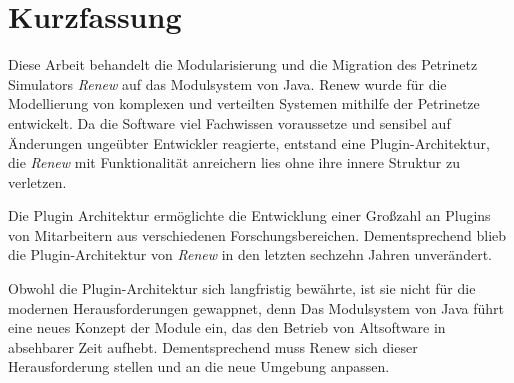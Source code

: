 



\newpage

\chapter*{Kurzfassung}
Diese Arbeit behandelt die Modularisierung und die Migration des Petrinetz Simulators \textit{Renew} auf das Modulsystem von Java.\newline
Renew wurde für die Modellierung von komplexen und verteilten Systemen mithilfe der Petrinetze entwickelt. Da die Software viel Fachwissen voraussetze und sensibel auf Änderungen ungeübter Entwickler reagierte, entstand eine Plugin-Architektur, die \textit{Renew} mit Funktionalität anreichern lies ohne ihre innere Struktur zu verletzen. 

Die Plugin Architektur ermöglichte die Entwicklung einer Großzahl an Plugins von Mitarbeitern aus verschiedenen Forschungsbereichen. Dementsprechend blieb die Plugin-Architektur von \textit{Renew} in den letzten sechzehn Jahren unverändert. \bigbreak

Obwohl die Plugin-Architektur sich langfristig bewährte, ist sie nicht für die modernen Herausforderungen gewappnet, denn Das Modulsystem von Java führt eine neues Konzept der Module ein, das den Betrieb von Altsoftware 
in absehbarer Zeit aufhebt. Dementsprechend muss Renew sich dieser Herausforderung stellen und an die neue Umgebung anpassen. \newline


